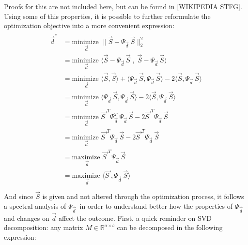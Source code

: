 \documentclass[11pt]{scrartcl} %
\begin{document}
Proofs for this are not included here, but can be found in [WIKIPEDIA STFG]. Using some of this properties, it is possible to further reformulate the optimization objective into a more convenient expression:
  \begin{align*}
    \begin{aligned}
      \vec{d}^* &=  \underset{ \vec{d}}{\text{minimize }}
      \bigg\lVert \vec{S}- \Psi_{\vec{d}\;} \vec{S} \bigg\rVert_2^2\\%
      &=  \underset{ \vec{d}}{\text{minimize }} \langle \vec{S}- \Psi_{\vec{d}\;} \vec{S} \;,\; \vec{S}- \Psi_{\vec{d}\;} \vec{S}\rangle\\
      &=  \underset{ \vec{d}}{\text{minimize }} \langle \vec{S}, \vec{S} \rangle + \langle \Psi_{\vec{d}\;} \vec{S}, \Psi_{\vec{d}\;} \vec{S} \rangle - 2 \langle \vec{S},  \Psi_{\vec{d}\;} \vec{S} \rangle\\
      &=  \underset{ \vec{d}}{\text{minimize }} \langle \Psi_{\vec{d}\;} \vec{S}, \Psi_{\vec{d}\;} \vec{S} \rangle - 2 \langle \vec{S},  \Psi_{\vec{d}\;} \vec{S} \rangle\\
      &=  \underset{ \vec{d}}{\text{minimize }} \vec{S\;}^T \Psi_{\vec{d}\;}^T\Psi_{\vec{d}\;} \vec{S}  - 2 \vec{S\;}^T \Psi_{\vec{d}\;} \vec{S}\\
      &=  \underset{ \vec{d}}{\text{minimize }} \vec{S\;}^T \Psi_{\vec{d}\;} \vec{S}  - 2 \vec{S\;}^T \Psi_{\vec{d}\;} \vec{S}\\
      &=  \underset{ \vec{d}}{\text{maximize }} \vec{S\;}^T \Psi_{\vec{d}\;} \vec{S}\\
      &=  \underset{ \vec{d}}{\text{maximize }} \langle \vec{S\;}, \Psi_{\vec{d}\;} \vec{S} \rangle\\
    \end{aligned}
  \end{align*}
  And since \(\vec{S}\) is given and not altered through the optimization process, it follows a spectral analysis of \( \Psi_{\vec{d}\;}\) in order to understand better how the properties of \(\Phi_{\vec{d}\;}\) and changes on \(\vec{d}\) affect the outcome. First, a quick reminder on SVD decomposition: any matrix \(M\in\mathbb{R}^{a\times b}\) can be decomposed in the following expression:
\end{document}
